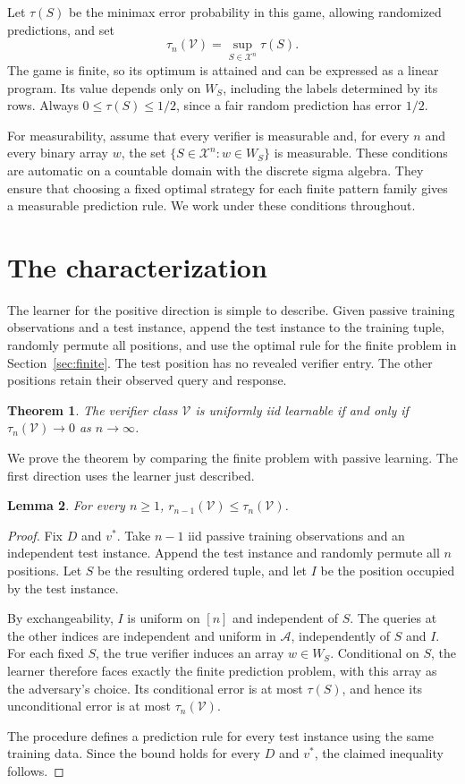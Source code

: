 \documentclass[11pt]{article}
\newcommand{\X}{\mathcal X}
\newcommand{\V}{\mathcal V}
\newcommand{\A}{\mathcal A}
\newtheorem{theorem}{Theorem}
\newtheorem{lemma}[theorem]{Lemma}
\begin{document}
Let $\tau(S)$ be the minimax error probability in this game, allowing
randomized predictions, and set
\[
\tau_n(\V)=\sup_{S\in\X^n}\tau(S).
\]
The game is finite, so its optimum is attained and can be expressed as a
linear program. Its value depends only on $W_S$, including the labels
determined by its rows. Always $0\le\tau(S)\le1/2$, since a fair random
prediction has error $1/2$.

For measurability, assume that every verifier is measurable and, for every
$n$ and every binary array $w$, the set
$\{S\in\X^n:w\in W_S\}$ is measurable. These conditions are automatic
on a countable domain with the discrete sigma algebra. They ensure that
choosing a fixed optimal strategy for each finite pattern family gives a
measurable prediction rule. We work under these conditions throughout.

\section{The characterization}\label{sec:characterization}

The learner for the positive direction is simple to describe. Given passive
training observations and a test instance, append the test instance to the
training tuple, randomly permute all positions, and use the optimal rule for
the finite problem in Section~\ref{sec:finite}. The test position has no
revealed verifier entry. The other positions retain their observed query
and response.

\begin{theorem}\label{thm:characterization}
The verifier class $\V$ is uniformly iid learnable if and only if
$\tau_n(\V)\to0$ as $n\to\infty$.
\end{theorem}

We prove the theorem by comparing the finite problem with passive learning.
The first direction uses the learner just described.

\begin{lemma}\label{lem:batch-from-finite}
For every $n\ge1$, $r_{n-1}(\V)\le\tau_n(\V)$.
\end{lemma}
\begin{proof}
Fix $D$ and $v^*$. Take $n-1$ iid passive training observations and an
independent test instance. Append the test instance and randomly permute
all $n$ positions. Let $S$ be the resulting ordered tuple, and let $I$ be
the position occupied by the test instance.

By exchangeability, $I$ is uniform on $[n]$ and independent of $S$. The
queries at the other indices are independent and uniform in $\A$,
independently of $S$ and $I$. For each fixed $S$, the true verifier induces
an array $w\in W_S$. Conditional on $S$, the learner therefore faces
exactly the finite prediction problem, with this array as the adversary's
choice. Its conditional error is at most $\tau(S)$, and hence its
unconditional error is at most $\tau_n(\V)$.

The procedure defines a prediction rule for every test instance using the
same training data. Since the bound holds for every $D$ and $v^*$, the
claimed inequality follows.
\end{proof}
\end{document}
